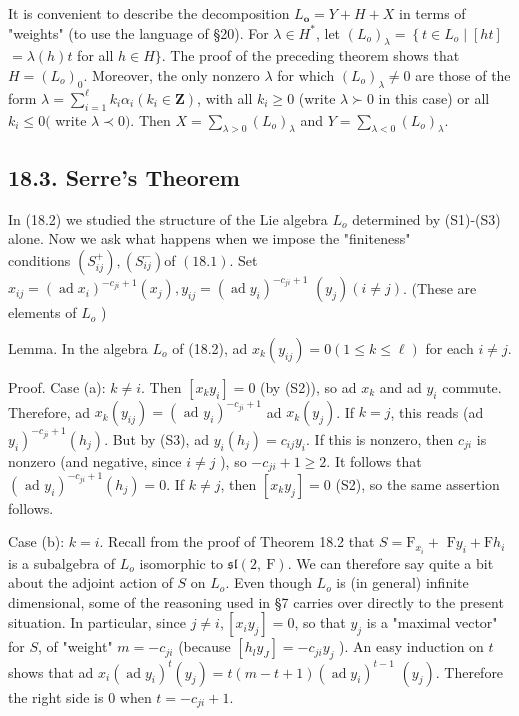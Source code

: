 \documentclass[10pt]{article}
\begin{document}
It is convenient to describe the decomposition $L_{\boldsymbol{o}}=Y+H+X$ in terms of "weights" (to use the language of §20). For $\lambda \in H^{*}$, let $\left(L_{o}\right)_{\lambda}=\left\{t \in L_{o} \mid[h t]\right.$ $=\lambda(h) t$ for all $h \in H\}$. The proof of the preceding theorem shows that $H=\left(L_{o}\right)_{0}$. Moreover, the only nonzero $\lambda$ for which $\left(L_{o}\right)_{\lambda} \neq 0$ are those of the form $\lambda=\sum_{i=1}^{\ell} k_{i} \alpha_{i}\left(k_{i} \in \mathbf{Z}\right)$, with all $k_{i} \geq 0$ (write $\lambda \succ 0$ in this case) or all $k_{i} \leq 0($ write $\lambda \prec 0)$. Then $X=\sum_{\lambda>0}\left(L_{o}\right)_{\lambda}$ and $Y=\sum_{\lambda<0}\left(L_{o}\right)_{\lambda}$.

\subsection*{18.3. Serre's Theorem}
In (18.2) we studied the structure of the Lie algebra $L_{o}$ determined by (S1)-(S3) alone. Now we ask what happens when we impose the "finiteness"\\
conditions $\left(S_{i j}^{+}\right),\left(S_{i j}^{-}\right)$of $(18.1)$. Set $x_{i j}=\left(\operatorname{ad} x_{i}\right)^{-c_{j i}+1}\left(x_{j}\right), y_{i j}=\left(\operatorname{ad} y_{i}\right)^{-c_{j i}+1}$ $\left(y_{j}\right)(i \neq j)$. (These are elements of $L_{o}$ )

Lemma. In the algebra $L_{o}$ of (18.2), ad $x_{k}\left(y_{i j}\right)=0(1 \leq k \leq \ell)$ for each $i \neq j$.

Proof. Case (a): $k \neq i$. Then $\left[x_{k} y_{i}\right]=0$ (by (S2)), so ad $x_{k}$ and ad $y_{i}$ commute. Therefore, ad $x_{k}\left(y_{i j}\right)=\left(\text { ad } y_{i}\right)^{-c_{j i}+1}$ ad $x_{k}\left(y_{j}\right)$. If $k=j$, this reads (ad $\left.y_{i}\right)^{-c_{j i}+1}\left(h_{j}\right)$. But by (S3), ad $y_{i}\left(h_{j}\right)=c_{i j} y_{i}$. If this is nonzero, then $c_{j i}$ is nonzero (and negative, since $i \neq j$ ), so $-c_{j i}+1 \geq 2$. It follows that $\left(\text { ad } y_{i}\right)^{-c_{j i}+1}\left(h_{j}\right)=0$. If $k \neq j$, then $\left[x_{k} y_{j}\right]=0$ (S2), so the same assertion follows.

Case (b): $k=i$. Recall from the proof of Theorem 18.2 that $S=\mathrm{F}_{x_{i}}+$ $\mathrm{F} y_{i}+\mathrm{F} h_{i}$ is a subalgebra of $L_{o}$ isomorphic to $\mathfrak{s l}(2, \mathrm{~F})$. We can therefore say quite a bit about the adjoint action of $S$ on $L_{o}$. Even though $L_{o}$ is (in general) infinite dimensional, some of the reasoning used in §7 carries over directly to the present situation. In particular, since $j \neq i,\left[x_{i} y_{j}\right]=0$, so that $y_{j}$ is a "maximal vector" for $S$, of "weight" $m=-c_{j i}$ (because $\left[h_{l} y_{J}\right]=-c_{j i} y_{j}$ ). An easy induction on $t$ shows that ad $x_{i}\left(\operatorname{ad} y_{i}\right)^{t}\left(y_{j}\right)=t(m-t+1)\left(\operatorname{ad} y_{i}\right)^{t-1}$ $\left(y_{j}\right)$. Therefore the right side is 0 when $t=-c_{j i}+1$.
\end{document}
